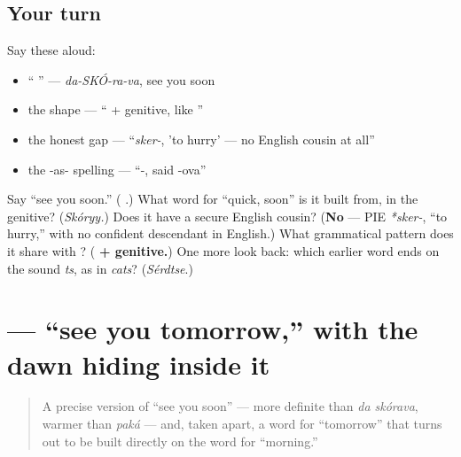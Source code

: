 \subsection*{Your turn}
Say these aloud:

\begin{itemize}
\raggedright
  \item \textquotedblleft{} \textquotedblright{} — \emph{da-SKÓ-ra-va}, see you soon
  \item the shape — \textquotedblleft{} + genitive, like  \textquotedblright{}
  \item the honest gap — \textquotedblleft{}\emph{sker-}, 'to hurry' — no English cousin at all\textquotedblright{}
  \item the -as- spelling — \textquotedblleft{}-, said -ova\textquotedblright{}
\end{itemize}

\begin{tcolorbox}[breakable,colback=teal!4,colframe=teal!35!black,title={Before you move on}]
Say \textquotedblleft{}see you soon.\textquotedblright{} (\textbf{ }.) What word for \textquotedblleft{}quick, soon\textquotedblright{} is it built from, in the genitive? (\emph{Skóryy.}) Does it have a secure English cousin? (\textbf{No} — PIE \emph{*sker-}, \textquotedblleft{}to hurry,\textquotedblright{} with no confident descendant in English.) What grammatical pattern does it share with \emph{ }? (\textbf{ + genitive.}) One more look back: which earlier word ends on the sound \emph{ts}, as in \emph{cats}? (\emph{Sérdtse}.)
\end{tcolorbox}
\section[\texorpdfstring{\ru{до} \ru{завтра} (da záftra)}{до завтра (da záftra)}]{  — \textquotedblleft{}see you tomorrow,\textquotedblright{} with the dawn hiding inside it}

\label{lesson:RU-C11-do-zavtra}



\begin{quote}
A precise version of \textquotedblleft{}see you soon\textquotedblright{} — more definite than \emph{da skórava}, warmer than \emph{paká} — and, taken apart, a word for \textquotedblleft{}tomorrow\textquotedblright{} that turns out to be built directly on the word for \textquotedblleft{}morning.\textquotedblright{}
\end{quote}

